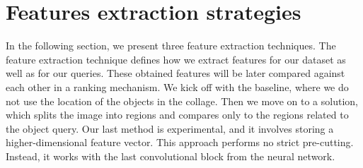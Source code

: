 \section{Features extraction strategies}

In the following section, we present three feature extraction techniques. The feature extraction technique defines how we extract features for our dataset as well as for our queries. These obtained features will be later compared against each other in a ranking mechanism. We kick off with the baseline, where we do not use the location of the objects in the collage. Then we move on to a solution, which splits the image into regions and compares only to the regions related to the object query. Our last method is experimental, and it involves storing a higher-dimensional feature vector. This approach performs no strict pre-cutting. Instead, it works with the last convolutional block from the neural network.

